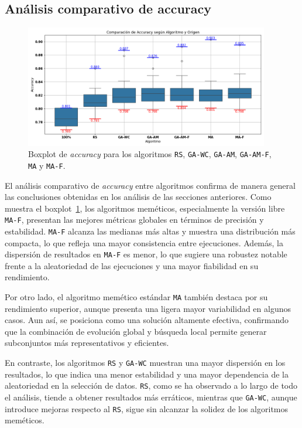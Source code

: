 \subsection{Análisis comparativo de accuracy}\label{sec:comparacion-final-accuracy}
\begin{figure}[htp]
    \centering
    \includegraphics[width=0.95\textwidth]{imagenes/evaluaciones/final/boxplot-por-algoritmo.png}
    \caption{Boxplot de \textit{accuracy} para los algoritmos \texttt{RS}, \texttt{GA-WC}, \texttt{GA-AM}, \texttt{GA-AM-F}, \texttt{MA} y \texttt{MA-F}.}
    \label{fig:boxplot-comparacion-final}
\end{figure}
El análisis comparativo de \textit{accuracy} entre algoritmos confirma de manera general las conclusiones obtenidas en los análisis de las secciones anteriores.
Como muestra el boxplot~\ref{fig:boxplot-comparacion-final}, los algoritmos meméticos, especialmente la versión libre \texttt{MA-F},
presentan las mejores métricas globales en términos de precisión y estabilidad.
\texttt{MA-F} alcanza las medianas más altas y muestra una distribución más compacta, lo que refleja una mayor consistencia entre ejecuciones.
Además, la dispersión de resultados en \texttt{MA-F} es menor, lo que sugiere una robustez notable frente a la aleatoriedad de las ejecuciones y una mayor fiabilidad en su rendimiento.

Por otro lado, el algoritmo memético estándar \texttt{MA} también destaca por su rendimiento superior,
aunque presenta una ligera mayor variabilidad en algunos casos.
Aun así, se posiciona como una solución altamente efectiva,
confirmando que la combinación de evolución global y búsqueda local permite generar subconjuntos más representativos y eficientes.

En contraste, los algoritmos \texttt{RS} y \texttt{GA-WC} muestran una mayor dispersión en los resultados,
lo que indica una menor estabilidad y una mayor dependencia de la aleatoriedad en la selección de datos.
\texttt{RS}, como se ha observado a lo largo de todo el análisis, tiende a obtener resultados más erráticos, mientras que \texttt{GA-WC},
aunque introduce mejoras respecto al \texttt{RS}, sigue sin alcanzar la solidez de los algoritmos meméticos.

